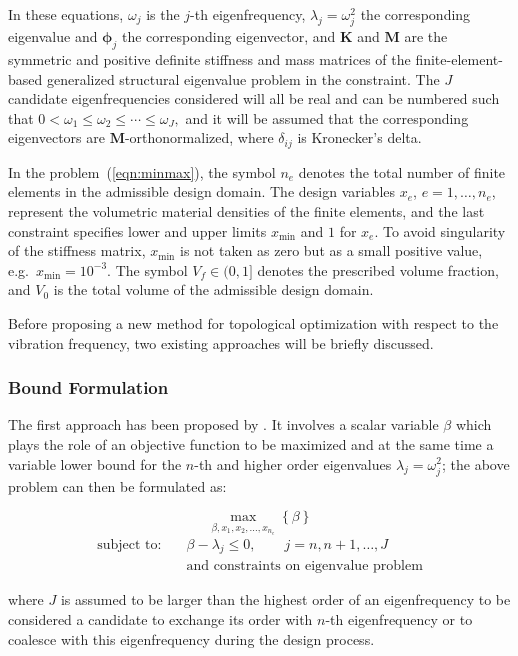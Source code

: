 \documentclass[applsci,article,submit,pdftex,moreauthors]{Definitions/mdpi}
\begin{document}
In these equations, $\omega_j$ is the $j$-th eigenfrequency, $\lambda_j = \omega_j^2$ the corresponding eigenvalue and $\boldsymbol{\phi}_j$ the corresponding eigenvector, and $\mathbf{K}$ and $\mathbf{M}$ are the symmetric and positive definite stiffness and mass matrices of the finite-element-based generalized structural eigenvalue problem in the constraint. The $J$ candidate eigenfrequencies considered will all be real and can be numbered such that $0 < \omega_1 \le \omega_2 \le \cdots \le \omega_J,$ and it will be assumed that the corresponding eigenvectors are $\mathbf{M}$-orthonormalized, where $\delta_{ij}$ is Kronecker’s delta.

In the problem~(\ref{eqn:minmax}), the symbol $n_e$ denotes the total number of finite elements in the admissible design domain. The design variables $x_e$, $e=1,\ldots,n_e$, represent the volumetric material densities of the finite elements, and the last constraint specifies lower and upper limits $x_{\min}$ and $1$ for $x_e$. To avoid singularity of the stiffness matrix, $x_{\min}$ is not taken as zero but as a small positive value, e.g.\ $x_{\min} = 10^{-3}$. The symbol $V_f \in (0,1]$ denotes the prescribed volume fraction, and $V_0$ is the total volume of the admissible design domain.

Before proposing a new method for topological optimization with respect to the vibration frequency, two existing approaches will be briefly discussed.

\subsubsection{Bound Formulation}

The first approach has been proposed by \citet{DU2007}. It involves a scalar variable $\beta$ which plays the role of an objective function to be maximized and at the same time a variable lower bound for the $n$-th and higher order eigenvalues $\lambda_j = \omega_j^2$; the above problem can then be formulated as:

\begin{equation}
 \max_{\beta,x_1,x_2,\dots,x_{n_e}} \left\{ \beta \right\}
\end{equation}
\begin{align*}
\text{subject to:} \quad & \beta - \lambda_j \le 0, \qquad j = n, n+1, \dots, J \\
& \text{and constraints on eigenvalue problem}
\end{align*}

where $J$ is assumed to be larger than the highest order of an eigenfrequency to be considered a candidate to exchange its order with $n$-th eigenfrequency or to coalesce with this eigenfrequency during the design process.
\end{document}

